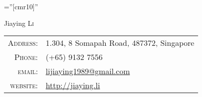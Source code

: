 \documentclass[a4paper,10pt]{article}
\begin{document}
\pagestyle{empty} %

\font\fb=''[cmr10]'' %

\par{\centering
		{\Huge Jiaying \textsc{Li}
	}
\bigskip
\par}


\begin{tabular}{rl}
    \textsc{Address:}   & 1.304, 8 Somapah Road, 487372, Singapore\\
    \textsc{Phone:}     & (+65) 9132 7556\\
    \textsc{email:}     & \href{mailto:lijiaying1989@gmail.com}{lijiaying1989@gmail.com}\\
	\textsc{website:}   &  \href{http://jiaying.li}{http://jiaying.li}
\end{tabular}

\end{document}
